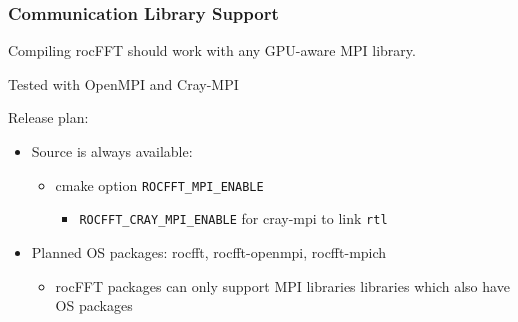 \documentclass[10pt,aspectratio=169]{beamer}
\begin{document}
\begin{frame}
  \frametitle{Communication Library Support}

  Compiling rocFFT should work with any GPU-aware MPI library.

  \medskip
  
  Tested with OpenMPI and Cray-MPI

  \bigskip
  
  Release plan:
  \begin{itemize}
  \item Source is always available:
    \begin{itemize}
    \item cmake option \lstinline{ROCFFT_MPI_ENABLE}
      \begin{itemize}
        \item \lstinline{ROCFFT_CRAY_MPI_ENABLE} for cray-mpi to link
          \lstinline{rtl}
      \end{itemize}
    \end{itemize}
  \item Planned OS packages: rocfft, rocfft-openmpi, rocfft-mpich
    \begin{itemize}
    \item rocFFT packages can only support MPI libraries libraries
      which also have OS packages
    \end{itemize}
  \end{itemize}
  \medskip

  
\end{frame}
\end{document}

